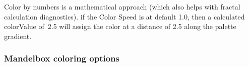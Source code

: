 Color by numbers is a mathematical approach (which also helps with fractal calculation diagnostics).
if the Color Speed is at default 1.0, then a calculated colorValue of 2.5 will assign the color at a distance of 2.5 along the palette gradient.

\subsubsection{Mandelbox coloring options}\label{materials-mandelbox}








